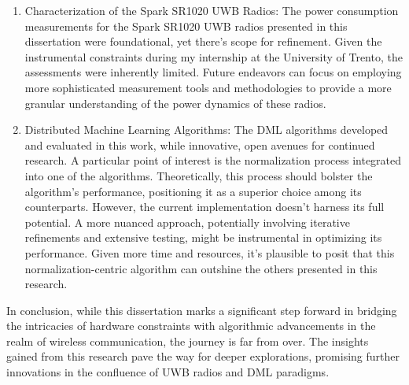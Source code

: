 \begin{enumerate}
    \item Characterization of the Spark SR1020 UWB Radios: The power consumption measurements for the Spark SR1020 UWB radios presented in this dissertation were foundational, yet there's scope for refinement. Given the instrumental constraints during my internship at the University of Trento, the assessments were inherently limited. Future endeavors can focus on employing more sophisticated measurement tools and methodologies to provide a more granular understanding of the power dynamics of these radios.
    \item Distributed Machine Learning Algorithms: The DML algorithms developed and evaluated in this work, while innovative, open avenues for continued research. A particular point of interest is the normalization process integrated into one of the algorithms. Theoretically, this process should bolster the algorithm's performance, positioning it as a superior choice among its counterparts. However, the current implementation doesn't harness its full potential. A more nuanced approach, potentially involving iterative refinements and extensive testing, might be instrumental in optimizing its performance. Given more time and resources, it's plausible to posit that this normalization-centric algorithm can outshine the others presented in this research.
\end{enumerate}


In conclusion, while this dissertation marks a significant step forward in bridging the intricacies of hardware constraints with algorithmic advancements in the realm of wireless communication, the journey is far from over. The insights gained from this research pave the way for deeper explorations, promising further innovations in the confluence of UWB radios and DML paradigms.


\newpage





